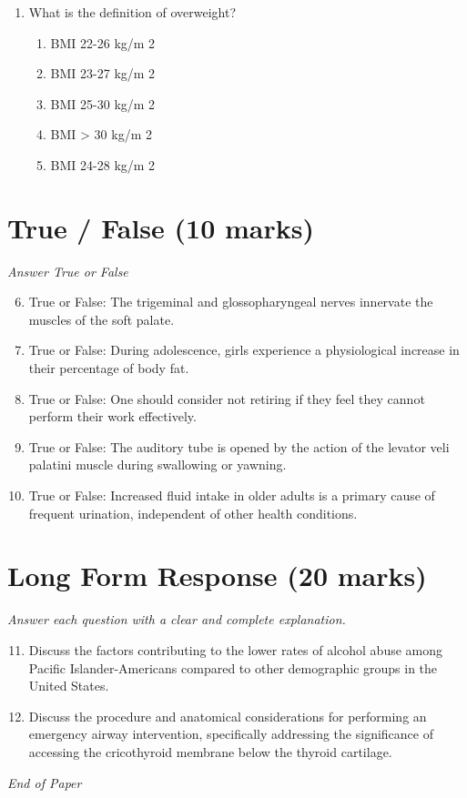 \documentclass[12pt]{article}
\begin{document}
\begin{enumerate}[label=\arabic*.]
\begin{enumerate}[label=(\alph*)]
    \item the ligaments of the TMJ and the medial pterygoid muscle.
    \item the articular disc of the TMJ and the medial pterygoid muscle.
    \item the articular disc of the TMJ and the medial and lateral pterygoid muscles.
\end{enumerate}
\item What is the definition of overweight?
\begin{enumerate}[label=(\alph*)]
    \item BMI 22-26 kg/m 2
    \item BMI 23-27 kg/m 2
    \item BMI 25-30 kg/m 2
    \item BMI \textgreater{} 30 kg/m 2
    \item BMI 24-28 kg/m 2
\end{enumerate}
\end{enumerate}

\section*{True / False (10 marks)}
\textit{Answer True or False}
\begin{enumerate}[label=\arabic*.]
\setcounter{enumi}{5}
\item True or False: The trigeminal and glossopharyngeal nerves innervate the muscles of the soft palate.
\item True or False: During adolescence, girls experience a physiological increase in their percentage of body fat.
\item True or False: One should consider not retiring if they feel they cannot perform their work effectively.
\item True or False: The auditory tube is opened by the action of the levator veli palatini muscle during swallowing or yawning.
\item True or False: Increased fluid intake in older adults is a primary cause of frequent urination, independent of other health conditions.
\end{enumerate}

\section*{Long Form Response (20 marks)}
\textit{Answer each question with a clear and complete explanation.}
\begin{enumerate}[label=\arabic*.]
\setcounter{enumi}{10}
\item Discuss the factors contributing to the lower rates of alcohol abuse among Pacific Islander-Americans compared to other demographic groups in the United States.
\item Discuss the procedure and anatomical considerations for performing an emergency airway intervention, specifically addressing the significance of accessing the cricothyroid membrane below the thyroid cartilage.
\end{enumerate}

\vfill
\noindent\textit{End of Paper}
\end{document}
